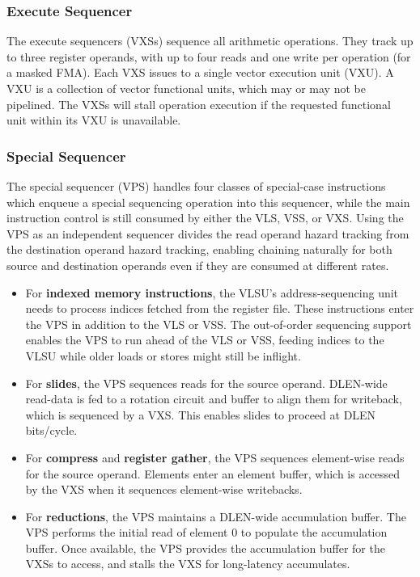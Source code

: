 \subsubsection{Execute Sequencer}

The execute sequencers (VXSs) sequence all arithmetic operations.
They track up to three register operands, with up to four reads and one write per operation (for a masked FMA).
Each VXS issues to a single vector execution unit (VXU).
A VXU is a collection of vector functional units, which may or may not be pipelined.
The VXSs will stall operation execution if the requested functional unit within its VXU is unavailable.


\subsubsection{Special Sequencer}

The special sequencer (VPS) handles four classes of special-case instructions which enqueue a special sequencing operation into this sequencer, while the main instruction control is still consumed by either the VLS, VSS, or VXS.
Using the VPS as an independent sequencer divides the read operand hazard tracking from the destination operand hazard tracking, enabling chaining naturally for both source and destination operands even if they are consumed at different rates.

\begin{itemize}
\item For \textbf{indexed memory instructions}, the VLSU's address-sequencing unit needs to process indices fetched from the register file.
These instructions enter the VPS in addition to the VLS or VSS.
The out-of-order sequencing support enables the VPS to run ahead of the VLS or VSS, feeding indices to the VLSU while older loads or stores might still be inflight.
\item For \textbf{slides}, the VPS sequences reads for the source operand.
DLEN-wide read-data is fed to a rotation circuit and buffer to align them for writeback, which is sequenced by a VXS.
This enables slides to proceed at DLEN bits/cycle.
\item For \textbf{compress} and \textbf{register gather}, the VPS sequences element-wise reads for the source operand.
Elements enter an element buffer, which is accessed by the VXS when it sequences element-wise writebacks.
\item For \textbf{reductions}, the VPS maintains a DLEN-wide accumulation buffer.
The VPS performs the initial read of element 0 to populate the accumulation buffer.
Once available, the VPS provides the accumulation buffer for the VXSs to access, and stalls the VXS for long-latency accumulates.
\end{itemize}

